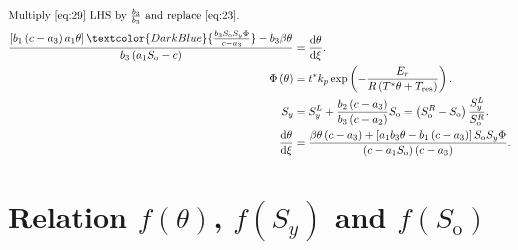 \documentclass[
    8pt,
    aspectratio=1610,
    c,
    intlimits,
    leqno,
    professionalfonts,
]{beamer}
\begin{document}
\begin{frame}
	\frametitle{\secname}

	\begin{align}
		\shortintertext{Multiply~\eqref{eq:29} LHS by
			$\frac{b_{3}}{b_{3}}$ and replace~\eqref{eq:23}.}
		\frac{
		\left[
			b_{1}
			\left(c-a_{3}\right)
			a_{1}\theta
			\right]
		\textcolor{DarkBlue}{
		\frac{
		b_{3}
		S_{\text{o}}
		S_{y}
		\Phi
		}{c-a_{3}}
		}
		-b_{3}\beta\theta
		}{
		b_{3}
		\left(
		a_{1}S_{\text{o}}-c
		\right)
		}                       & =
		\diff{\theta}{\xi}.\notag   \\
		\setcounter{equation}{33}
		\Phi\left(\theta\right) & =
		t^{\ast}k_{p}
		\exp
		\left(
		-\frac{E_{r}}{
			R\left(T^{\ast}\theta+T_{\text{res}}\right)
		}
		\right).\label{eq:34}       \\
		S_{y}                   & =
		S^{L}_{y}+
		\frac{b_{2}\left(c-a_{3}\right)}{b_{3}\left(c-a_{2}\right)}
		S_{\text{o}}=
		\left(
		S^{R}_{\text{o}}-
		S_{\text{o}}
		\right)
		\frac{S^{L}_{y}}{S^{R}_{\text{o}}}.
		\label{eq:35}               \\
		\diff{\theta}{\xi}
		                        & =
		\frac{
			\beta\theta
			\left(c-a_{3}\right)+
			\left[
				a_{1}
				b_{3}
				\theta-
				b_{1}
				\left(c-a_{3}\right)
				\right]
			S_{\text{o}}
			S_{y}
			\Phi}{
			\left(c-a_{1}S_{\text{o}}\right)
			\left(c-a_{3}\right)
		}.\label{eq:36}
	\end{align}
\end{frame}

\section{Relation $f\left(\theta\right)$, $f\left(S_{y}\right)$ and
  $f\left(S_{\text{o}}\right)$}
\end{document}
